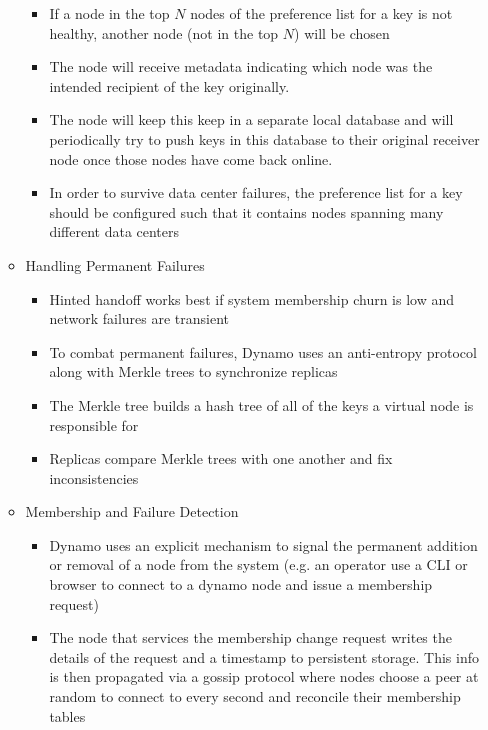 \documentclass[a4paper]{article}
\begin{document}
\begin{itemize}
\begin{itemize}
\begin{itemize}
\item If a node in the top $N$ nodes of the preference list for a key is not healthy, another node (not in the top $N$) will be chosen

\item The node will receive metadata indicating which node was the intended recipient of the key originally.

\item The node will keep this keep in a separate local database and will periodically try to push keys in this database to their original receiver node once those nodes have come back online.

\item In order to survive data center failures, the preference list for a key should be configured such that it contains nodes spanning many different data centers
\end{itemize}

\item Handling Permanent Failures
\begin{itemize}
\item Hinted handoff works best if system membership churn is low and network failures are transient

\item To combat permanent failures, Dynamo uses an anti-entropy protocol along with Merkle trees to synchronize replicas

\item The Merkle tree builds a hash tree of all of the keys a virtual node is responsible for

\item Replicas compare Merkle trees with one another and fix inconsistencies
\end{itemize}

\item Membership and Failure Detection
\begin{itemize}
\item Dynamo uses an explicit mechanism to signal the permanent addition or removal of a node from the system (e.g. an operator use a CLI or browser to connect to a dynamo node and issue a membership request)

\item The node that services the membership change request writes the details of the request and a timestamp to persistent storage. This info is then propagated via a gossip protocol where nodes choose a peer at random to connect to every second and reconcile their membership tables


\end{itemize}
\end{itemize}
\end{itemize}
\end{document}
